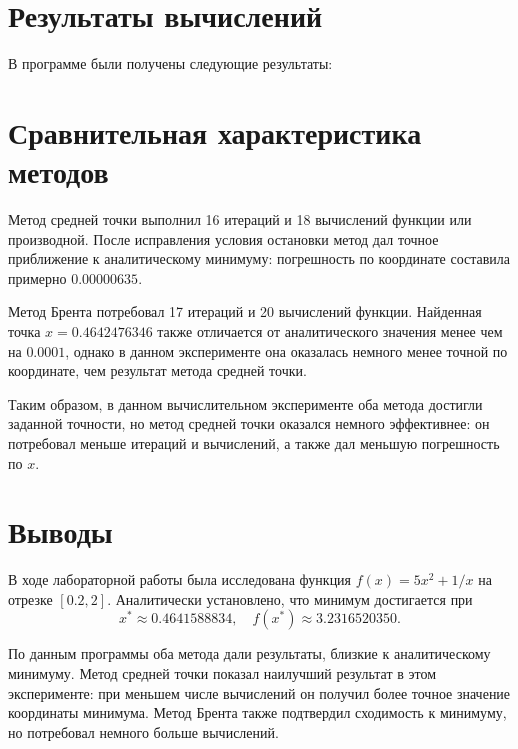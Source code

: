 \documentclass[12pt, letterpaper]{article}
\begin{document}
\section{Результаты вычислений}
В программе были получены следующие результаты:
\begin{center}
   \small
\end{center}


\section{Сравнительная характеристика методов}
Метод средней точки выполнил 16 итераций и 18 вычислений функции или производной. После исправления условия остановки метод дал точное приближение к аналитическому минимуму: погрешность по координате составила примерно $0.00000635$.

Метод Брента потребовал 17 итераций и 20 вычислений функции. Найденная точка $x = 0.4642476346$ также отличается от аналитического значения менее чем на $0.0001$, однако в данном эксперименте она оказалась немного менее точной по координате, чем результат метода средней точки.

Таким образом, в данном вычислительном эксперименте оба метода достигли заданной точности, но метод средней точки оказался немного эффективнее: он потребовал меньше итераций и вычислений, а также дал меньшую погрешность по $x$.

\section{Выводы}
В ходе лабораторной работы была исследована функция $f(x) = 5x^2 + 1/x$ на отрезке $[0.2, 2]$.
Аналитически установлено, что минимум достигается при
\[
    x^* \approx 0.4641588834,
    \quad
    f(x^*) \approx 3.2316520350.
\]

По данным программы оба метода дали результаты, близкие к аналитическому минимуму. Метод средней точки показал наилучший результат в этом эксперименте: при меньшем числе вычислений он получил более точное значение координаты минимума. Метод Брента также подтвердил сходимость к минимуму, но потребовал немного больше вычислений.
\end{document}
